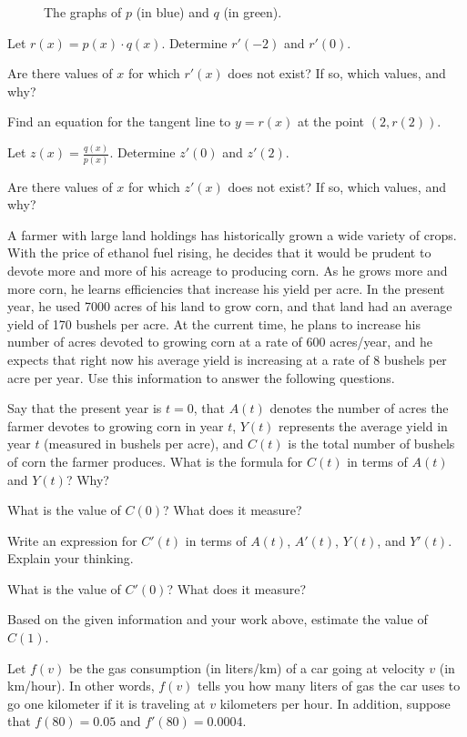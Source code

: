 \begin{exercises}
\begin{figure}[h]
\begin{center}
\caption{The graphs of $p$ (in blue) and $q$ (in green).} \label{F:2.3.Ez3}
\end{center}
\end{figure}
\ba
	\item Let $r(x) = p(x) \cdot q(x)$.  Determine $r'(-2)$ and $r'(0)$.
	\item Are there values of $x$ for which $r'(x)$ does not exist?  If so, which values, and why?
	\item Find an equation for the tangent line to $y = r(x)$ at the point $(2,r(2))$.
	\item Let $z(x) = \frac{q(x)}{p(x)}$.  Determine $z'(0)$ and $z'(2)$.
	\item Are there values of $x$ for which $z'(x)$ does not exist?  If so, which values, and why?	
\ea
\item A farmer with large land holdings has historically grown a wide variety of crops.  With the price of ethanol fuel rising, he decides that it would be prudent to devote more and more of his acreage to producing corn.  As he grows more and more corn, he learns efficiencies that increase his yield per acre.  In the present year, he used 7000 acres of his land to grow corn, and that land had an average yield of 170 bushels per acre.  At the current time, he plans to increase his number of acres devoted to growing corn at a rate of 600 acres/year, and he expects that right now his average yield is increasing at a rate of 8 bushels per acre per year.  Use this information to answer the following questions.
\ba
	\item Say that the present year is $t = 0$, that $A(t)$ denotes the number of acres the farmer devotes to growing corn in year $t$, $Y(t)$ represents the average yield in year $t$ (measured in bushels per acre), and $C(t)$ is the total number of bushels of corn the farmer produces.  What is the formula for $C(t)$ in terms of $A(t)$ and $Y(t)$?  Why?
	\item What is the value of $C(0)$?  What does it measure?
	\item Write an expression for $C'(t)$ in terms of $A(t)$, $A'(t)$, $Y(t)$, and $Y'(t)$.  Explain your thinking.
	\item What is the value of $C'(0)$?  What does it measure?
	\item Based on the given information and your work above, estimate the value of $C(1)$.	
\ea
\item Let $f(v)$ be the gas consumption (in liters/km) of a car going at velocity $v$ (in km/hour). In other words, $f(v)$ tells you how many liters of gas the car uses to go one  kilometer if it is traveling at $v$ kilometers per hour. In addition, suppose that $f(80)=0.05$ and $f'(80) = 0.0004$.

\end{exercises}
